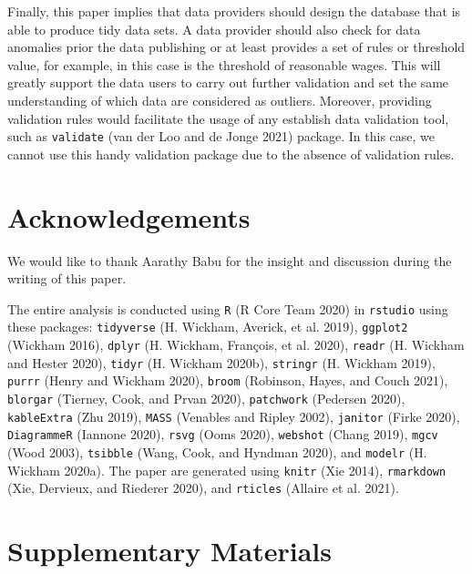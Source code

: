 \documentclass{article}
\begin{document}
Finally, this paper implies that data providers should design the database that is able to produce tidy data sets. A data provider should also check for data anomalies prior the data publishing or at least provides a set of rules or threshold value, for example, in this case is the threshold of reasonable wages. This will greatly support the data users to carry out further validation and set the same understanding of which data are considered as outliers. Moreover, providing validation rules would facilitate the usage of any establish data validation tool, such as \texttt{validate} (van der Loo and de Jonge 2021) package. In this case, we cannot use this handy validation package due to the absence of validation rules.

\hypertarget{acknowledgements}{%
\section{Acknowledgements}\label{acknowledgements}}

We would like to thank Aarathy Babu for the insight and discussion during the writing of this paper.

The entire analysis is conducted using \texttt{R} (R Core Team 2020) in \texttt{rstudio} using these packages: \texttt{tidyverse} (H. Wickham, Averick, et al. 2019), \texttt{ggplot2} (Wickham 2016), \texttt{dplyr} (H. Wickham, François, et al. 2020), \texttt{readr} (H. Wickham and Hester 2020), \texttt{tidyr} (H. Wickham 2020b), \texttt{stringr} (H. Wickham 2019), \texttt{purrr} (Henry and Wickham 2020), \texttt{broom} (Robinson, Hayes, and Couch 2021), \texttt{blorgar} (Tierney, Cook, and Prvan 2020), \texttt{patchwork} (Pedersen 2020), \texttt{kableExtra} (Zhu 2019), \texttt{MASS} (Venables and Ripley 2002), \texttt{janitor} (Firke 2020), \texttt{DiagrammeR} (Iannone 2020), \texttt{rsvg} (Ooms 2020), \texttt{webshot} (Chang 2019), \texttt{mgcv} (Wood 2003), \texttt{tsibble} (Wang, Cook, and Hyndman 2020), and \texttt{modelr} (H. Wickham 2020a). The paper are generated using \texttt{knitr} (Xie 2014), \texttt{rmarkdown} (Xie, Dervieux, and Riederer 2020), and \texttt{rticles} (Allaire et al. 2021).

\hypertarget{supplementary-materials}{%
\section{Supplementary Materials}\label{supplementary-materials}}
\end{document}
